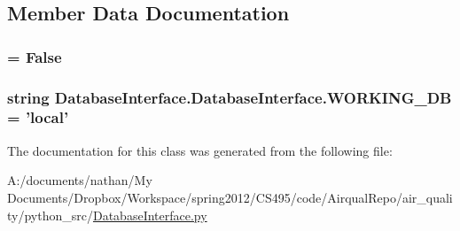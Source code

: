 \subsection{Member Data Documentation}
\hypertarget{class_database_interface_1_1_database_interface_ae92289621f90ec296eb0cd89b9f6fc91}{
\subsubsection[{D\-E\-B\-U\-G}]{ = False}}\label{class_database_interface_1_1_database_interface_ae92289621f90ec296eb0cd89b9f6fc91}
\hypertarget{class_database_interface_1_1_database_interface_ac0a2837d86558a1bfe62834dcd6274f3}{
\subsubsection[{W\-O\-R\-K\-I\-N\-G\-\_\-\-D\-B}]{\setlength{\rightskip}{0pt plus 5cm}string {\bf Database\-Interface.\-Database\-Interface.\-W\-O\-R\-K\-I\-N\-G\-\_\-\-D\-B} = 'local'}}\label{class_database_interface_1_1_database_interface_ac0a2837d86558a1bfe62834dcd6274f3}


The documentation for this class was generated from the following file\-:\begin{DoxyCompactItemize}
\item 
A\-:/documents/nathan/\-My Documents/\-Dropbox/\-Workspace/spring2012/\-C\-S495/code/\-Airqual\-Repo/air\-\_\-quality/python\-\_\-src/\hyperlink{_database_interface_8py}{Database\-Interface.\-py}\end{DoxyCompactItemize}
